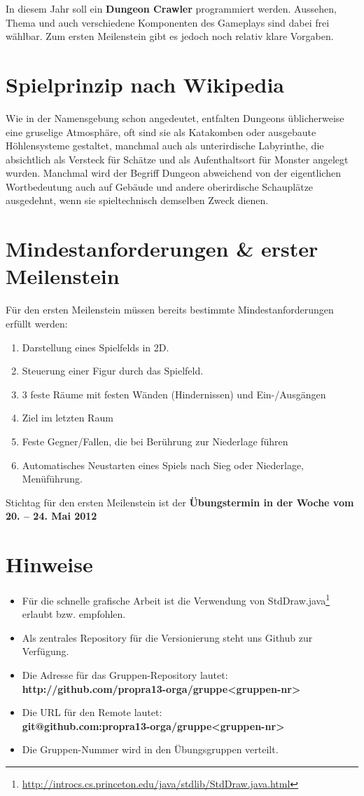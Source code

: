 \documentclass{programmierpraktikum}
\subtitle{Dungeon Crawler}
\begin{document}
%
\maketitle
In diesem Jahr soll ein \textbf{Dungeon Crawler} programmiert werden. Aussehen, Thema und auch
verschiedene Komponenten des Gameplays sind dabei frei wählbar. Zum ersten Meilenstein gibt es
jedoch noch relativ klare Vorgaben.
%
\section{Spielprinzip nach Wikipedia}
Wie in der Namensgebung schon angedeutet, entfalten Dungeons üblicherweise eine gruselige
Atmosphäre, oft sind sie als Katakomben oder ausgebaute Höhlensysteme gestaltet, manchmal auch
als unterirdische Labyrinthe, die absichtlich als Versteck für Schätze und als Aufenthaltsort
für Monster angelegt wurden. Manchmal wird der Begriff Dungeon abweichend von der eigentlichen
Wortbedeutung auch auf Gebäude und andere oberirdische Schauplätze ausgedehnt, wenn sie spieltechnisch
demselben Zweck dienen.
%
\section{Mindestanforderungen \& erster Meilenstein}
Für den ersten Meilenstein müssen bereits bestimmte Mindestanforderungen erfüllt werden:
\begin{enumerate}
  \item Darstellung eines Spielfelds in 2D.
  \item Steuerung einer Figur durch das Spielfeld.
  \item 3 feste Räume mit festen Wänden (Hindernissen) und Ein-/Ausgängen
  \item Ziel im letzten Raum
  \item Feste Gegner/Fallen, die bei Berührung zur Niederlage führen
  \item Automatisches Neustarten eines Spiels nach Sieg oder Niederlage, Menüführung.
\end{enumerate}
Stichtag für den ersten Meilenstein ist der \textbf{Übungstermin in der Woche vom 20. -- 24. Mai 2012}
%
\section{Hinweise}
\begin{itemize}
  \item Für die schnelle grafische Arbeit ist die Verwendung von
    StdDraw.java\footnote{\url{http://introcs.cs.princeton.edu/java/stdlib/StdDraw.java.html}} erlaubt
    bzw. empfohlen.
  \item Als zentrales Repository für die Versionierung steht uns Github zur Verfügung.
  \item Die Adresse für das Gruppen-Repository lautet:\\
    \textbf{http://github.com/propra13-orga/gruppe<gruppen-nr>}
  \item Die URL für den Remote lautet:\\
    \textbf{git@github.com:propra13-orga/gruppe<gruppen-nr>}
  \item Die Gruppen-Nummer wird in den Übungsgruppen verteilt.
\end{itemize}
%
\end{document}
